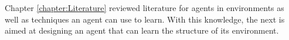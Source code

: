 Chapter \ref{chapter:Literature} reviewed literature for agents in environments as well as techniques an agent can use to learn. With this knowledge, the next is aimed at designing an agent that can learn the structure of its environment.


%
%
%
%
%
%
























